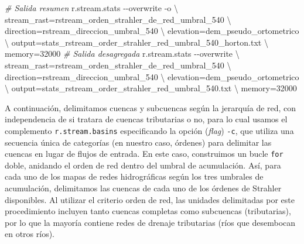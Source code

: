 \documentclass[spanish]{article}
\newenvironment{Shaded}{\begin{snugshade}}{\end{snugshade}}
\newcommand{\AttributeTok}[1]{\textcolor[rgb]{0.77,0.63,0.00}{#1}}
\newcommand{\CommentTok}[1]{\textcolor[rgb]{0.56,0.35,0.01}{\textit{#1}}}
\newcommand{\DataTypeTok}[1]{\textcolor[rgb]{0.13,0.29,0.53}{#1}}
\newcommand{\ExtensionTok}[1]{#1}
\newcommand{\NormalTok}[1]{#1}
\begin{document}
\begin{Shaded}
\begin{Highlighting}[]
\CommentTok{\# Salida resumen}
\ExtensionTok{r.stream.stats} \AttributeTok{{-}{-}overwrite} \AttributeTok{{-}o} \DataTypeTok{\textbackslash{}}
\NormalTok{  stream\_rast=rstream\_orden\_strahler\_de\_red\_umbral\_540 }\DataTypeTok{\textbackslash{}}
\NormalTok{  direction=rstream\_direccion\_umbral\_540 }\DataTypeTok{\textbackslash{}}
\NormalTok{  elevation=dem\_pseudo\_ortometrico }\DataTypeTok{\textbackslash{}}
\NormalTok{  output=stats\_rstream\_order\_strahler\_red\_umbral\_540\_horton.txt }\DataTypeTok{\textbackslash{}}
\NormalTok{  memory=32000}
\CommentTok{\# Salida desagregada}
\ExtensionTok{r.stream.stats} \AttributeTok{{-}{-}overwrite} \DataTypeTok{\textbackslash{}}
\NormalTok{  stream\_rast=rstream\_orden\_strahler\_de\_red\_umbral\_540 }\DataTypeTok{\textbackslash{}}
\NormalTok{  direction=rstream\_direccion\_umbral\_540 }\DataTypeTok{\textbackslash{}}
\NormalTok{  elevation=dem\_pseudo\_ortometrico }\DataTypeTok{\textbackslash{}}
\NormalTok{  output=stats\_rstream\_order\_strahler\_red\_umbral\_540.txt }\DataTypeTok{\textbackslash{}}
\NormalTok{  memory=32000}
\end{Highlighting}
\end{Shaded}

A continuación, delimitamos cuencas y subcuencas según la jerarquía de
red, con independencia de si tratara de cuencas tributarias o no, para
lo cual usamos el complemento \texttt{r.stream.basins} especificando la
opción (\emph{flag}) \texttt{-c}, que utiliza una secuencia única de
categorías (en nuestro caso, órdenes) para delimitar las cuencas en
lugar de flujos de entrada. En este caso, construimos un bucle
\texttt{for} doble, anidando el orden de red dentro del umbral de
acumulación. Así, para cada uno de los mapas de redes hidrográficas
según los tres umbrales de acumulación, delimitamos las cuencas de cada
uno de los órdenes de Strahler disponibles. Al utilizar el criterio
orden de red, las unidades delimitadas por este procedimiento incluyen
tanto cuencas completas como subcuencas (tributarias), por lo que la
mayoría contiene redes de drenaje tributarias (ríos que desembocan en
otros ríos).
\end{document}

